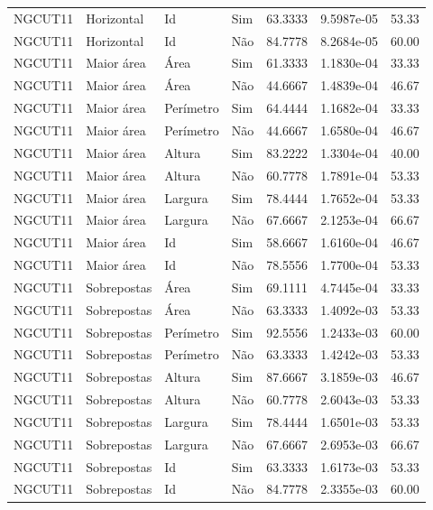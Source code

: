 \begin{tabular}{llllrrr}
    NGCUT11   & Horizontal  & Id        & Sim         & 63.3333      & 9.5987e-05 & 53.33    \\
    NGCUT11   & Horizontal  & Id        & Não         & 84.7778      & 8.2684e-05 & 60.00    \\
    NGCUT11   & Maior área  & Área      & Sim         & 61.3333      & 1.1830e-04 & 33.33    \\
    NGCUT11   & Maior área  & Área      & Não         & 44.6667      & 1.4839e-04 & 46.67    \\
    NGCUT11   & Maior área  & Perímetro & Sim         & 64.4444      & 1.1682e-04 & 33.33    \\
    NGCUT11   & Maior área  & Perímetro & Não         & 44.6667      & 1.6580e-04 & 46.67    \\
    NGCUT11   & Maior área  & Altura    & Sim         & 83.2222      & 1.3304e-04 & 40.00    \\
    NGCUT11   & Maior área  & Altura    & Não         & 60.7778      & 1.7891e-04 & 53.33    \\
    NGCUT11   & Maior área  & Largura   & Sim         & 78.4444      & 1.7652e-04 & 53.33    \\
    NGCUT11   & Maior área  & Largura   & Não         & 67.6667      & 2.1253e-04 & 66.67    \\
    NGCUT11   & Maior área  & Id        & Sim         & 58.6667      & 1.6160e-04 & 46.67    \\
    NGCUT11   & Maior área  & Id        & Não         & 78.5556      & 1.7700e-04 & 53.33    \\
    NGCUT11   & Sobrepostas & Área      & Sim         & 69.1111      & 4.7445e-04 & 33.33    \\
    NGCUT11   & Sobrepostas & Área      & Não         & 63.3333      & 1.4092e-03 & 53.33    \\
    NGCUT11   & Sobrepostas & Perímetro & Sim         & 92.5556      & 1.2433e-03 & 60.00    \\
    NGCUT11   & Sobrepostas & Perímetro & Não         & 63.3333      & 1.4242e-03 & 53.33    \\
    NGCUT11   & Sobrepostas & Altura    & Sim         & 87.6667      & 3.1859e-03 & 46.67    \\
    NGCUT11   & Sobrepostas & Altura    & Não         & 60.7778      & 2.6043e-03 & 53.33    \\
    NGCUT11   & Sobrepostas & Largura   & Sim         & 78.4444      & 1.6501e-03 & 53.33    \\
    NGCUT11   & Sobrepostas & Largura   & Não         & 67.6667      & 2.6953e-03 & 66.67    \\
    NGCUT11   & Sobrepostas & Id        & Sim         & 63.3333      & 1.6173e-03 & 53.33    \\
    NGCUT11   & Sobrepostas & Id        & Não         & 84.7778      & 2.3355e-03 & 60.00    \\
    \hline
\end{tabular}
